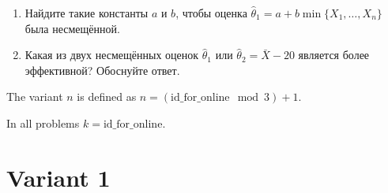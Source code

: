 \documentclass[12pt]{article}
\newcommand \id {\mathrm{id}\_\mathrm{for}\_\mathrm{online}}
\begin{document}
\begin{enumerate}
\begin{enumerate}
\item Найдите такие константы $a$ и $b$, чтобы оценка  $\hat \theta_1 = a + b\min\{X_1, \ldots, X_n\}$ была несмещённой.
\item Какая из двух несмещённых оценок $\hat \theta_1$ или $\hat \theta_2 = \bar X - 20$ является более эффективной? Обоснуйте ответ.
\end{enumerate}

\end{enumerate}




\newpage

The variant $n$ is defined as $n=(\id \mod 3)+1$. 

In all problems $k=\id$.

\section*{Variant 1}
\end{document}
